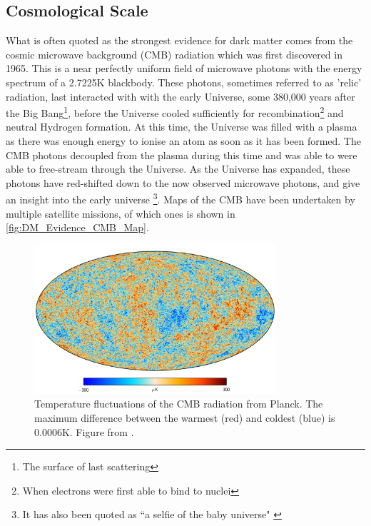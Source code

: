 \subsection{Cosmological Scale}
\par
What is often quoted as the strongest evidence for dark matter comes from the cosmic microwave background (CMB) radiation which was first discovered in 1965.
This is a near perfectly uniform field of microwave photons with the energy spectrum of a 2.7225K blackbody.
These photons, sometimes referred to as 'relic' radiation, last interacted with with the early Universe, some 380,000 years after the Big Bang\footnote{The surface of last scattering}, before the Universe cooled sufficiently for recombination\footnote{When electrons were first able to bind to nuclei} and neutral Hydrogen formation.
At this time, the Universe was filled with a plasma as there was enough energy to ionise an atom as soon as it has been formed.
The CMB photons decoupled from the plasma during this time and was able to were able to free-stream through the Universe.
As the Universe has expanded, these photons have red-shifted down to the now observed microwave photons, and give an insight into the early universe \footnote{It has also been quoted as ``a selfie of the baby universe" \cite{marisarthurs_thesis_ref}}.
Maps of the CMB have been undertaken by multiple satellite missions, of which ones is shown in \autoref{fig:DM_Evidence_CMB_Map}.

\begin{figure}[!htbp]%
    \centering
    \includegraphics[width=0.8\textwidth]{Figures/DarkMatterEvidence/cmb_radiation.png}
    \caption[Temperature fluctuations of the CMB radiation]{Temperature fluctuations of the CMB radiation from Planck.
             The maximum difference between the warmest (red) and coldest (blue) is 0.0006K.
             Figure from \cite{plank_result_ref}.}
    \label{fig:DM_Evidence_CMB_Map}
\end{figure}

